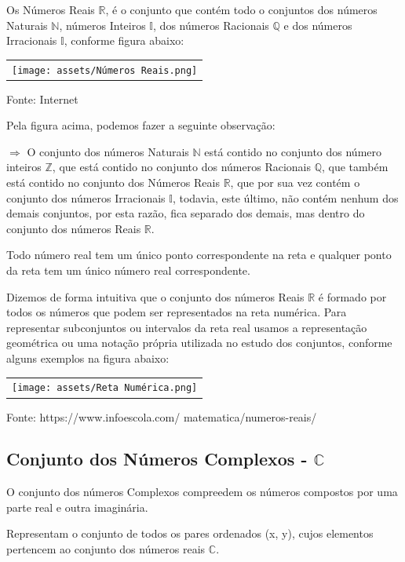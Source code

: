 \begin{multicols*}{2}
	Os Números Reais $\mathbb{R}$, é o conjunto que contém todo o conjuntos dos números Naturais $\mathbb{N}$, números Inteiros $\mathbb{I}$, dos números Racionais $\mathbb{Q}$ e dos números Irracionais $\mathbb{I}$, conforme figura abaixo:
	
	 \begin{tabular}{@{}c@{}}
		\texttt{[image: assets/Números Reais.png]}
		\end{tabular}

	Fonte: Internet 
	
	Pela figura acima, podemos fazer a seguinte observação:
	
	$\Rightarrow$ O conjunto dos números Naturais $\mathbb{N}$ está contido no conjunto dos número inteiros $\mathbb{Z}$, que está contido no conjunto dos números Racionais $\mathbb{Q}$, que também está contido no conjunto dos Números Reais $\mathbb{R}$, que por sua vez contém o conjunto dos números Irracionais $\mathbb{I}$, todavia, este último, não contém nenhum dos demais conjuntos, por esta razão, fica separado dos demais, mas dentro do conjunto dos números Reais $\mathbb{R}$.
	
	Todo número real tem um único ponto correspondente na reta e qualquer ponto da reta tem um único número real correspondente.
	
	Dizemos de forma intuitiva que o conjunto dos números Reais $\mathbb{R}$ é formado por todos os números que podem ser representados na reta numérica. Para representar subconjuntos ou intervalos da reta real usamos a representação geométrica ou uma notação própria utilizada no estudo dos conjuntos, conforme alguns exemplos na figura abaixo:
	
	\begin{tabular}{@{}c@{}}
	\texttt{[image: assets/Reta Numérica.png]}
\end{tabular}

	Fonte: 	https://www.infoescola.com/
	matematica/numeros-reais/\\
			
	\subsection{Conjunto dos Números Complexos - $\mathbb{C}$}
	
	O conjunto dos números Complexos compreedem os números compostos por uma parte real e outra imaginária.
	
	Representam o conjunto de todos os pares ordenados (x, y), cujos elementos pertencem ao conjunto dos números reais $\mathbb{C}$.
	

\end{multicols*}
